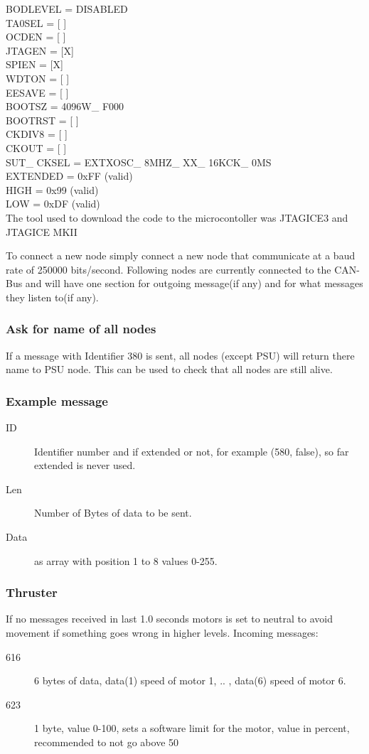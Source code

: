 \noindent BODLEVEL = DISABLED\\
TA0SEL = [ ]\\
OCDEN = [ ]\\
JTAGEN = [X]\\
SPIEN = [X]\\
WDTON = [ ]\\
EESAVE = [ ]\\
BOOTSZ = 4096W\_ F000\\
BOOTRST = [ ]\\
CKDIV8 = [ ]\\
CKOUT = [ ]\\
SUT\_ CKSEL = EXTXOSC\_ 8MHZ\_ XX\_ 16KCK\_ 0MS\\

\noindent EXTENDED = 0xFF (valid)\\
HIGH = 0x99 (valid)\\
LOW = 0xDF (valid)\\

\noindent The tool used to download the code to the microcontoller was JTAGICE3\cite{JTAGICE3} and JTAGICE MKII\cite{JTAGICEMKII} 

To connect a new node simply connect a new node that communicate at a baud rate of 250000 bits/second. Following nodes are currently connected to the CAN-Bus and will have one section for outgoing message(if any) and for what messages they listen to(if any).

\subsubsection{Ask for name of all nodes}
If a message with Identifier 380 is sent, all nodes (except PSU) will return there name to PSU node. This can be used to check that all nodes are still alive.

\subsubsection{Example message}
\begin{description}
  \item[ID] Identifier number and if extended or not, for example (580, false), so far extended is never used.
  \item[Len] Number of Bytes of data to be sent.
  \item[Data] as array with position 1 to 8 values 0-255.
\end{description}

\subsubsection{Thruster}
If no messages received in last 1.0 seconds motors is set to neutral to avoid movement if something goes wrong in higher levels.
Incoming messages:
\begin{description}
  \item[616] 6 bytes of data, data(1) speed of motor 1, .. , data(6) speed of motor 6.
  \item[623] 1 byte, value 0-100, sets a software limit for the motor, value in percent, recommended to not go above 50%
\end{description}


